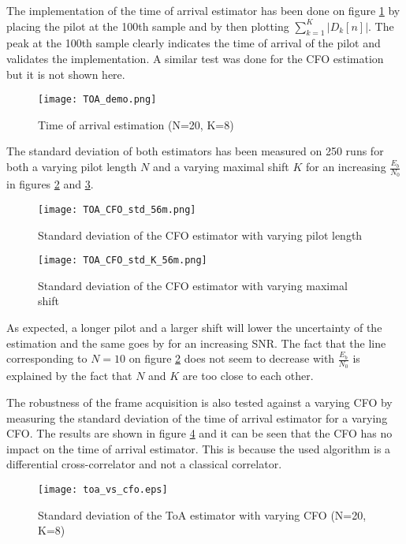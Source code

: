 The implementation of the time of arrival estimator has been done on figure \ref{fig:TOA_demo} by placing the pilot at the 100th sample and by then plotting $\sum_{k=1}^{K} |D_k[n]|$. The peak at the 100th sample clearly indicates the time of arrival of the pilot and validates the implementation. A similar test was done for the CFO estimation but it is not shown here. \par

\begin{figure}[H]
    \centering
    \texttt{[image: TOA\_demo.png]}
    \caption{Time of arrival estimation (N=20, K=8)}
    \label{fig:TOA_demo}
\end{figure}

The standard deviation of both estimators has been measured on 250 runs for both a varying pilot length $N$ and a varying maximal shift $K$ for an increasing $\frac{E_b}{N_0}$ in figures \ref{fig:TOA_CFO_std_N} and \ref{fig:TOA_CFO_std_K}. 

\begin{figure}[H]
    \centering
    \texttt{[image: TOA\_CFO\_std\_56m.png]}
    \caption{Standard deviation of the CFO estimator with varying pilot length}
    \label{fig:TOA_CFO_std_N}
\end{figure}

\begin{figure}[H]
    \centering
    \texttt{[image: TOA\_CFO\_std\_K\_56m.png]}
    \caption{Standard deviation of the CFO estimator with varying maximal shift}
    \label{fig:TOA_CFO_std_K}
\end{figure}

As expected, a longer pilot and a larger shift will lower the uncertainty of the estimation and the same goes by for an increasing SNR. The fact that the line corresponding to $N = 10$ on figure \ref{fig:TOA_CFO_std_N} does not seem to decrease with $\frac{E_b}{N_0}$ is explained by the fact that $N$ and $K$ are too close to each other.\par
The robustness of the frame acquisition is also tested against a varying CFO by measuring the standard deviation of the time of arrival estimator for a varying CFO. The results are shown in figure \ref{fig:TOA_std_CFO} and it can be seen that the CFO has no impact on the time of arrival estimator. This is because the used algorithm is a differential cross-correlator and not a classical correlator. \par

\begin{figure}[H]
    \centering
    \texttt{[image: toa\_vs\_cfo.eps]}
    \caption{Standard deviation of the ToA estimator with varying CFO (N=20, K=8)}
    \label{fig:TOA_std_CFO}
\end{figure}

